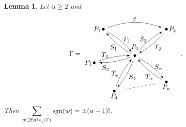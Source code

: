\documentclass{amsproc}
\newtheorem{lemma}[theorem]{Lemma}
\theoremstyle{definition}
\theoremstyle{remark}
\numberwithin{equation}{section}
\newcommand{\sgn}{{\rm sgn}}
\newcommand{\nodeDist}{2}
\newcommand{\labelDist}{0.1}
\newcommand{\uni}{{\rm Eul}}
\begin{document}
\begin{lemma}\label{diag_Eulerian_sum_2}
Let $\alpha\geqslant 2$ and 
\renewcommand{\nodeDist}{2}
\renewcommand{\labelDist}{0.1}
\[\Gamma=
\begin{tikzpicture}[baseline,vertex/.style={anchor=base, circle, fill,minimum size=4pt, inner sep=0pt, outer sep=0pt},auto,
                               edge/.style={->,>=latex, shorten > = 5pt,shorten < = 5pt},
position/.style args={#1:#2 from #3}{
    at=(#3.#1), anchor=#1+180, shift=(#1:#2)
}]

  \node[vertex] (v0) {};
  \node[vertex,position = 140:{\nodeDist} from v0] (v1) {};
  \node[vertex,position = 40:{\nodeDist} from v0] (v2) {};
  \node[vertex,position = 190:{\nodeDist} from v0] (v3) {};
  \node[vertex,position = 240:{\nodeDist} from v0] (v4) {};
  \node[vertex,position = 320:{\nodeDist} from v0] (v5) {};

  \draw (v0) node[above=5] {$P_0$};
  \draw (v1) node[left] {$P_{1}$};
  \draw (v2) node[right] {$P_{2}$};
  \draw (v3) node[left] {$P_{3}$};
  \draw (v4) node[below] {$P_{4}$};
  \draw (v5) node[below] {$P_{\alpha}$};

  \draw[edge] (v0) to [bend left=10] node[below=5, left=-3] {$S_{1}$} (v1);
  \draw[edge] (v1) to [bend left=10] node[above=2, right] {$T_{1}$} (v0);

  \draw[edge] (v1) to [bend left=20] node[above] {$e$} (v2);

  \draw[edge] (v0) to [bend left=10] node[above=2, left] {$S_{2}$} (v2);
  \draw[edge] (v2) to [bend left=10] node[below=5, right] {$T_{2}$} (v0);

  \draw[edge] (v0) to [bend left=10] node[below=10, left=5] {$S_{3}$} (v3);
  \draw[edge] (v3) to [bend left=10] node[above=3, left=5] {$T_{3}$} (v0);

  \draw[edge] (v0) to [bend left=10] node[below = 4, right] {$S_{4}$} (v4);
  \draw[edge] (v4) to [bend left=10] node[below=2, left=3] {$T_{4}$} (v0);

  \draw[dashed, shorten > = 14pt, shorten < = 14pt, bend right=10] (v4) -- (v5);

  \draw[edge] (v0) to [bend left=10] node[right] {$S_{\alpha}$} (v5);
  \draw[edge] (v5) to [bend left=10] node[below=2] {$T_{\alpha}$} (v0);
\end{tikzpicture}\ .
\]
Then $\displaystyle \sum_{w\in \uni_{P_1}(\Gamma)}\sgn(w)=\pm(\alpha-1)!$.
\end{lemma}
\end{document}
